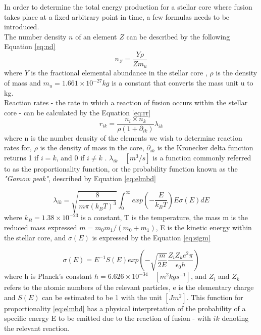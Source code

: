 \documentclass[10pt, nofootinbib, twocolumn]{revtex4-1}
\begin{document}
In order to determine the total energy production for a stellar core where fusion takes place at a fixed arbitrary point in time, a few formulas needs to be introduced. \\

\newpage
The number density $n$ of an element $Z$ can be described by the following Equation \eqref{eq:nd}
\begin{equation}
    n_Z = \frac{Y\rho}{Zm_u} \label{eq:nd}
\end{equation}
where $Y$ is the fractional elemental abundance in the stellar core \cite[p.~25]{ast}, $\rho$ is the density of mass and $m_u=1.661\times10^{-27}kg$ is a constant that converts the mass unit u to kg.  \\

Reaction rates - the rate in which a reaction of fusion occurs within the stellar core - can be calculated by the Equation \eqref{eq:rr}
\begin{equation}
    r_{ik} = \frac{n_i\times n_k}{\rho (1+\partial_{ik})}\lambda_{ik} \label{eq:rr}
\end{equation}
where n is the number density of the elements we wish to determine reaction rates for, $\rho$ is the density of mass in the core, $\partial_{ik}$ is the Kronecker delta function
returns 1 if $i=k$, and 0 if $i\neq k$ \cite{quant}. $\lambda_{ik} \quad [m^3/s]$ is a function commonly referred to as the proportionality function, or the probability function known as the \textit{"Gamow peak"}, described by Equation \eqref{eq:elmbd}

\begin{equation}
    \lambda_{ik}=\sqrt{\frac{8}{m\pi(k_BT)^3}}\int_0^\infty{exp(-\frac{E}{k_BT})E\sigma (E)dE} \label{eq:elmbd}
\end{equation}
where $k_B=1.38\times 10^{-23}$ is a constant, T is the temperature,  the mass m is the reduced mass expressed $m=m_0m_1/(m_0+m_1)$, E is the kinetic energy within the stellar core, and $\sigma (E)$ is expressed by the Equation \eqref{eq:sigm}

\begin{equation}
    \sigma (E)=E^{-1}S(E)exp(-\sqrt{\frac{m}{2E}}\frac{Z_iZ_ke^2\pi}{\epsilon_0h}) \label{eq:sigm}
\end{equation}
where h is Planck's constant $h=6.626\times 10^{-34} \quad [m^2kgs^{-1}]$, and $Z_i$ and $Z_k$ refers to the atomic numbers of the relevant particles, e is the elementary charge and $S(E)$ can be estimated to be 1 with the unit $[Jm^2]$. This function for proportionality \eqref{eq:elmbd} has a physical interpretation of the probability of a specific energy E to be emitted due to the reaction of fusion - with $ik$ denoting the relevant reaction.  \\
\end{document}
